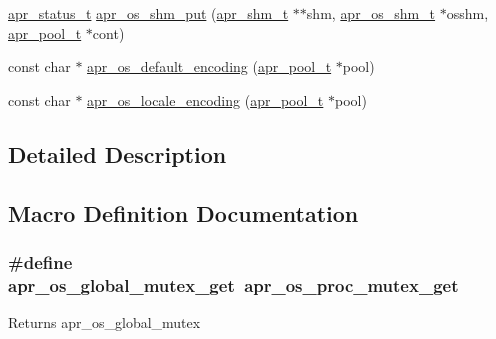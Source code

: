 \begin{DoxyCompactItemize}
\item 
\hyperlink{group__apr__errno_gaf76ee4543247e9fb3f3546203e590a6c}{apr\+\_\+status\+\_\+t} \hyperlink{group__apr__portabile_gaac2b48e4ea4ac8f959cd0e78ede6c5f2}{apr\+\_\+os\+\_\+shm\+\_\+put} (\hyperlink{group__apr__shm_ga79e8c16bdeaf7ade4ef0f935249e7c2f}{apr\+\_\+shm\+\_\+t} $\ast$$\ast$shm, \hyperlink{group__apr__portabile_ga7af1085d6390fbd08d66482b8c17de51}{apr\+\_\+os\+\_\+shm\+\_\+t} $\ast$osshm, \hyperlink{group__apr__pools_gaf137f28edcf9a086cd6bc36c20d7cdfb}{apr\+\_\+pool\+\_\+t} $\ast$cont)
\item 
const char $\ast$ \hyperlink{group__apr__portabile_ga6e21845a4a5f3b7dd107b2beea50c91e}{apr\+\_\+os\+\_\+default\+\_\+encoding} (\hyperlink{group__apr__pools_gaf137f28edcf9a086cd6bc36c20d7cdfb}{apr\+\_\+pool\+\_\+t} $\ast$pool)
\item 
const char $\ast$ \hyperlink{group__apr__portabile_gaf4c49baaf6cb115c6c92e74e4a40fd46}{apr\+\_\+os\+\_\+locale\+\_\+encoding} (\hyperlink{group__apr__pools_gaf137f28edcf9a086cd6bc36c20d7cdfb}{apr\+\_\+pool\+\_\+t} $\ast$pool)
\end{DoxyCompactItemize}


\subsection{Detailed Description}


\subsection{Macro Definition Documentation}
\subsubsection[{\texorpdfstring{apr\+\_\+os\+\_\+global\+\_\+mutex\+\_\+get}{apr_os_global_mutex_get}}]{\setlength{\rightskip}{0pt plus 5cm}\#define apr\+\_\+os\+\_\+global\+\_\+mutex\+\_\+get~{\bf apr\+\_\+os\+\_\+proc\+\_\+mutex\+\_\+get}}\hypertarget{group__apr__portabile_gae9be7821e8c021915c930fc83d6d4a73}{}\label{group__apr__portabile_gae9be7821e8c021915c930fc83d6d4a73}
\begin{DoxyReturn}{Returns}
apr\+\_\+os\+\_\+global\+\_\+mutex 
\end{DoxyReturn}
